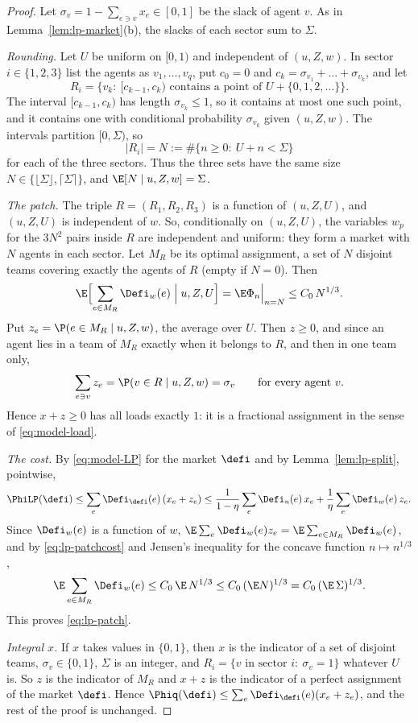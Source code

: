 \begin{proof}
Let $\sigma_v=1-\sum_{e\ni v}x_e\in[0,1]$ be the slack of agent $v$. As in
Lemma~\ref{lem:lp-market}(b), the slacks of each sector sum to $\Sigma$.

\emph{Rounding.} Let $U$ be uniform on $[0,1)$ and independent of $(u,Z,w)$. In sector
$i\in\{1,2,3\}$ list the agents as $v_1,\dots,v_q$, put $c_0=0$ and
$c_k=\sigma_{v_1}+\dots+\sigma_{v_k}$, and let
\[
R_i=\bigl\{v_k:\ [c_{k-1},c_k)\text{ contains a point of }U+\{0,1,2,\dots\}\bigr\}.
\]
The interval $[c_{k-1},c_k)$ has length $\sigma_{v_k}\le1$, so it contains at most one such
point, and it contains one with conditional probability $\sigma_{v_k}$ given $(u,Z,w)$. The
intervals partition $[0,\Sigma)$, so
\[
|R_i|=N:=\#\{n\ge0:\ U+n<\Sigma\}
\]
for each of the three sectors. Thus the three sets have the same size
$N\in\{\lfloor\Sigma\rfloor,\lceil\Sigma\rceil\}$, and $\E[N\mid u,Z,w]=\Sigma$.

\emph{The patch.} The triple $R=(R_1,R_2,R_3)$ is a function of $(u,Z,U)$, and $(u,Z,U)$ is
independent of $w$. So, conditionally on $(u,Z,U)$, the variables $w_p$ for the $3N^2$ pairs
inside $R$ are independent and uniform: they form a market with $N$ agents in each sector.
Let $M_R$ be its optimal assignment, a set of $N$ disjoint teams covering exactly the agents
of $R$ (empty if $N=0$). Then
\begin{equation}\label{eq:lp-patchcost}
\E\Bigl[\sum_{e\in M_R}\Defi_w(e)\Bigm|u,Z,U\Bigr]=\E\Phi_n\Big|_{n=N}\le C_0\,N^{1/3}.
\end{equation}
Put $z_e=\P(e\in M_R\mid u,Z,w)$, the average over $U$. Then $z\ge0$, and since an agent lies
in a team of $M_R$ exactly when it belongs to $R$, and then in one team only,
\[
\sum_{e\ni v}z_e=\P(v\in R\mid u,Z,w)=\sigma_v\qquad\text{for every agent }v .
\]
Hence $x+z\ge0$ has all loads exactly $1$: it is a fractional assignment in the sense of
\eqref{eq:model-load}.

\emph{The cost.} By \eqref{eq:model-LP} for the market $\defi$ and by
Lemma~\ref{lem:lp-split}, pointwise,
\[
\PhiLP(\defi)\le\sum_e\Defi_{\defi}(e)\,(x_e+z_e)
\le\frac1{1-\eta}\sum_e\Defi_u(e)\,x_e+\frac1\eta\sum_e\Defi_w(e)\,z_e .
\]
Since $\Defi_w(e)$ is a function of $w$, $\E\sum_e\Defi_w(e)z_e=\E\sum_{e\in M_R}\Defi_w(e)$,
and by \eqref{eq:lp-patchcost} and Jensen's inequality for the concave function
$n\mapsto n^{1/3}$,
\[
\E\sum_{e\in M_R}\Defi_w(e)\le C_0\,\E\,N^{1/3}\le C_0\,(\E N)^{1/3}=C_0\,(\E\,\Sigma)^{1/3}.
\]
This proves \eqref{eq:lp-patch}.

\emph{Integral $x$.} If $x$ takes values in $\{0,1\}$, then $x$ is the indicator of a set of
disjoint teams, $\sigma_v\in\{0,1\}$, $\Sigma$ is an integer, and
$R_i=\{v\text{ in sector }i:\ \sigma_v=1\}$ whatever $U$ is. So $z$ is the indicator of
$M_R$ and $x+z$ is the indicator of a perfect assignment of the market $\defi$. Hence
$\Phiq(\defi)\le\sum_e\Defi_{\defi}(e)(x_e+z_e)$, and the rest of the proof is unchanged.
\end{proof}

